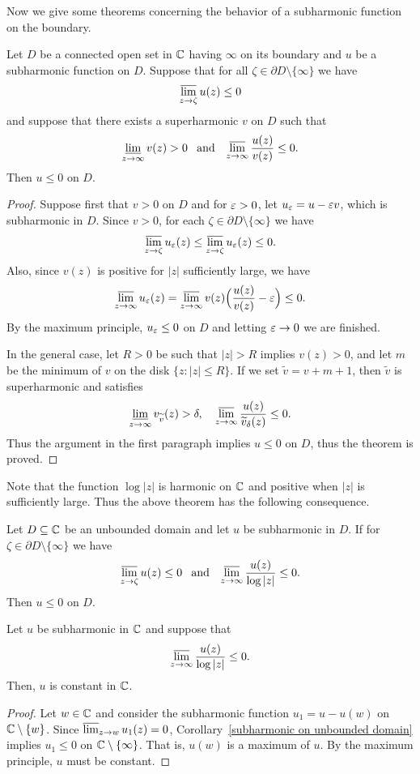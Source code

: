 Now we give some theorems concerning the behavior of a subharmonic function on the boundary.
\begin{theorem}\label{Phragmen-Lindelof principle}
Let $D$ be a connected open set in $\mathbb{C}$ having $\infty$ on its boundary and $u$ be a subharmonic function on $D$. Suppose that for all $\zeta\in\partial D\setminus\{\infty\}$ we have
\[\varlimsup_{z\to\zeta}u(z)\leq 0\]
and suppose that there exists a superharmonic $v$ on $D$ such that
\[\varliminf_{z\to \infty}v(z)>0\hspace{8pt}\text{and}\hspace{8pt}\varlimsup_{z\to\infty}\frac{u(z)}{v(z)}\leq 0.\]
Then $u\leq 0$ on $D$.
\end{theorem}
\begin{proof}
Suppose first that $v>0$ on $D$ and for $\varepsilon>0$, let $u_{\varepsilon}=u-\varepsilon v$, which is subharmonic in $D$. Since $v>0$, for each $\zeta\in\partial D\setminus\{\infty\}$ we have
\[\varlimsup_{z\to\zeta}u_{\varepsilon}(z)\leq\varlimsup_{z\to\zeta}u_{\varepsilon}(z)\leq 0.\]
Also, since $v(z)$ is positive for $|z|$ sufficiently large, we have
\[\varlimsup_{z\to\infty}u_\varepsilon(z)=\varlimsup_{z\to\infty}v(z)\Big(\frac{u(z)}{v(z)}-\varepsilon\Big)\leq 0.\]
By the maximum principle, $u_{\varepsilon}\leq 0$ on $D$ and letting $\varepsilon\to 0$ we are finished.\par
In the general case, let $R>0$ be such that $|z|>R$ implies $v(z)>0$, and let $m$ be the minimum of $v$ on the disk $\{z:|z|\leq R\}$. If we set $\widetilde{v}=v+m+1$, then $\widetilde{v}$ is superharmonic and satisfies
\[\varliminf_{z\to\infty}v_{\widetilde{v}}(z)>\delta,\quad\varlimsup_{z\to\infty}\frac{u(z)}{\widetilde{v}_{\delta}(z)}\leq 0.\]
Thus the argument in the first paragraph implies $u\leq 0$ on $D$, thus the theorem is proved.
\end{proof}
Note that the function $\log |z|$ is harmonic on $\mathbb{C}$ and positive when $|z|$ is sufficiently large. Thus the above theorem has the following consequence.
\begin{corollary}\label{subharmonic on unbounded domain}
Let $D\subseteq\mathbb{C}$ be an unbounded domain and let $u$ be subharmonic in $D$. If for $\zeta\in\partial D\setminus\{\infty\}$ we have
\[\varlimsup_{z\to\zeta}u(z)\leq 0\hspace{8pt}\text{and}\hspace{8pt} \varlimsup_{z\to\infty}\frac{u(z)}{\log|z|}\leq 0.\]
Then $u\leq 0$ on $D$.
\end{corollary}
\begin{theorem}
Let $u$ be subharmonic in $\mathbb{C}$ and suppose that
\[\varlimsup_{z\to\infty}\frac{u(z)}{\log|z|}\leq 0.\]
Then, $u$ is constant in $\mathbb{C}$.
\end{theorem}
\begin{proof}
Let $w\in\mathbb{C}$ and consider the subharmonic function $u_1=u-u(w)$ on $\mathbb{C}\setminus\{w\}$. Since $\varlimsup_{z\to w}u_1(z)=0$, Corollary~\ref{subharmonic on unbounded domain} implies $u_1\leq 0$ on $\mathbb{C}\setminus\{\infty\}$. That is, $u(w)$ is a maximum of $u$. By the maximum principle, $u$ must be constant.
\end{proof}
